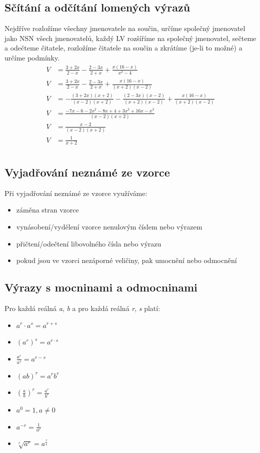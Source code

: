 \documentclass[12pt, a4paper]{article}
\begin{document}
\subsection*{Sčítání a odčítání lomených výrazů}
Nejdříve rozložíme všechny jmenovatele na součin, určíme společný jmenovatel jako NSN všech jmenovatelů, každý LV rozšíříme na společný jmenovatel, sečteme a odečteme čitatele, rozložíme čitatele na součin a zkrátíme (je-li to možné) a určíme podmínky.\\
\[
\begin{aligned}
	V &= \frac{3+2x}{2-x}-\frac{2-3x}{2+x}+\frac{x(16-x)}{x^2-4}\\
	V &= \frac{3+2x}{2-x}-\frac{2-3x}{2+x}+\frac{x(16-x)}{(x+2)(x-2)}\\
	V &=  -\frac{(3+2x)(x+2)}{(x-2)(x+2)}-\frac{(2-3x)(x-2)}{(x+2)(x-2)}+\frac{x(16-x)}{(x+2)(x-2)}\\
	V &= \frac{-7x-6-2x^2-8x+4+3x^2+16x-x^2}{(x-2)(x+2)}\\
	V &= \frac{x-2}{(x-2)(x+2)}\\
	V &= \frac{1}{x+2}\\
\end{aligned}
\]

\subsection*{Vyjadřování neznámé ze vzorce}
Při vyjadřování neznámé ze vzorce využíváme:
\begin{itemize}
	\item záměna stran vzorce
	\item vynásobení/vydělení vzorce nenulovým číslem nebo výrazem
	\item přičtení/odečtení libovolného čísla nebo výrazu
	\item pokud jsou ve vzorci nezáporné veličiny, pak umocnění nebo odmocnění
\end{itemize} 

\subsection*{Výrazy s mocninami a odmocninami}
Pro každá reálná \textit{a}, \textit{b} a pro každá reálná \textit{r}, \textit{s} platí:
\begin{itemize}
	\item $a^r \cdot a^s = a^{r+s}$
	\item $ (a^r)^s = a^{r \cdot s} $
	\item $ \frac{a^r}{a^s} = a^{r-s} $
	\item $ (ab)^r = a^rb^r $
	\item $ (\frac{a}{b})^r = \frac{a^r}{b^r} $
	\item $ a^0 = 1, a \neq 0 $
	\item $ a^{-r} = \frac{1}{a^r} $
	\item $ \sqrt [s]{a^r} = a^{\frac{r}{s}}$
\end{itemize}
\end{document}

